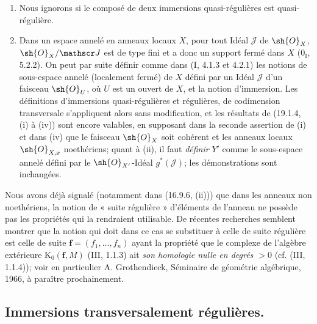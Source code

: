 \begin{remarks}[19.1.7]
\label{IV.19.1.7}
\begin{enumerate}
  \item[(i)] Nous ignorons si le composé de deux immersions quasi-régulières est quasi-régulière.
  \item[(ii)] Dans un espace annelé en anneaux locaux $X$, pour tout Idéal $\mathscr J$ de $\sh{O}_X$, $\sh{O}_X/\mathscr J$ est de type fini et a donc un support fermé dans $X$ ($0_{\mathrm I}$, 5.2.2). On peut par suite définir comme dans (I, 4.1.3 et 4.2.1) les notions de sous-espace annelé (localement fermé) de $X$ défini par un Idéal $\mathscr J$ d'un faisceau $\sh{O}_U$, où $U$ est un ouvert de $X$, et la notion d'immersion. Les définitions d'immersions quasi-régulières et régulières, de codimension transversale s'appliquent alors sans modification, et les résultats de (19.1.4, (i) à (iv)) sont encore valables, en supposant dans la seconde assertion de (i) et dans (iv) que le faisceau $\sh{O}_X$ soit cohérent et les anneaux locaux $\sh{O}_{X,x}$ noethériens; quant à (ii), il faut \emph{définir} $Y'$ comme le sous-espace annelé défini par le $\sh{O}_{X'}$-Idéal $g^*(\mathscr J)$; les démonstrations sont inchangées.
\end{enumerate}
\end{remarks}

\begin{env}[19.1.8]
\label{IV.19.1.8}
Nous avons déjà signalé (notamment dans (16.9.6, (ii))) que dans les anneaux non noethériens, la notion de « suite régulière » d'éléments de l'anneau ne possède pas les propriétés qui la rendraient utilisable. De récentes recherches semblent montrer que la notion qui doit dans ce cas se substituer à celle de suite régulière est celle de suite $\mathbf f=(f_1,\ldots,f_n)$ ayant la propriété que le complexe de l'algèbre extérieure $\mathrm K_0(\mathbf f,M)$ (III, 1.1.3) ait \emph{son homologie nulle en degrés $>0$} (cf. (III, 1.1.4)); voir en particulier A. Grothendieck, Séminaire de géométrie algébrique, 1966, à paraître prochainement.
\end{env}

\subsection{Immersions transversalement régulières.}

